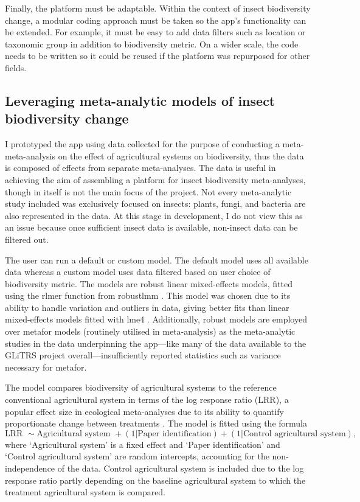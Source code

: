 \documentclass[11pt]{article}
\begin{document}
		\noindent Finally, the platform must be adaptable. Within the context of insect biodiversity change, a modular coding approach must be taken so the app’s functionality can be extended. For example, it must be easy to add data filters such as location or taxonomic group in addition to biodiversity metric. On a wider scale, the code needs to be written so it could be reused if the platform was repurposed for other fields.   
		
		\subsection{Leveraging meta-analytic models of insect biodiversity change}     
		I prototyped the app using data collected for the purpose of conducting a meta-meta-analysis on the effect of agricultural systems on biodiversity, thus the data is composed of effects from separate meta-analyses. The data is useful in achieving the aim of assembling a platform for insect biodiversity meta-analyses, though in itself is not the main focus of the project. Not every meta-analytic study included was exclusively focused on insects: plants, fungi, and bacteria are also represented in the data. At this stage in development, I do not view this as an issue because once sufficient insect data is available, non-insect data can be filtered out.
		
		\noindent The user can run a default or custom model. The default model uses all available data whereas a custom model uses data filtered based on user choice of biodiversity metric. The models are robust linear mixed-effects models, fitted using the rlmer function from robustlmm \citep{koller2016robustlmm}. This model was chosen due to its ability to handle variation and outliers in data, giving better fits than linear mixed-effects models fitted with lme4 \citep{bates2014fitting}. Additionally, robust models are employed over metafor models \citep{viechtbauer2010conducting} (routinely utilised in meta-analysis) as the meta-analytic studies in the data underpinning the app—like many of the data available to the GLiTRS project overall—insufficiently reported statistics such as variance necessary for metafor.
		
		\noindent The model compares biodiversity of agricultural systems to the reference conventional agricultural system in terms of the log response ratio (LRR), a popular effect size in ecological meta-analyses due to its ability to quantify proportionate change between treatments \citep{hedges1999meta}. The model is fitted using the formula
		\begin{equation}
		\mbox{LRR } \sim \mbox{Agricultural system } + (1|\mbox{Paper identification}) + (1|\mbox{Control agricultural system}),
		\end{equation}
		\noindent where ‘Agricultural system’ is a fixed effect and ‘Paper identification’ and ‘Control agricultural system’ are random intercepts, accounting for the non-independence of the data. Control agricultural system is included due to the log response ratio partly depending on the baseline agricultural system to which the treatment agricultural system is compared. 
		
\end{document}
